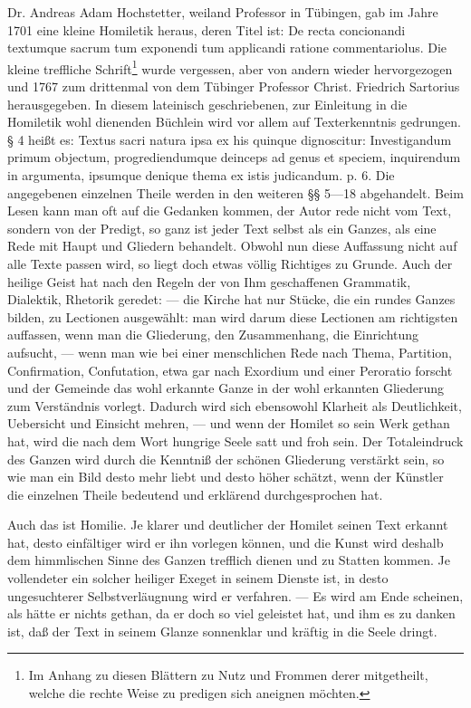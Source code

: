 Dr. Andreas Adam Hochstetter, weiland Professor in Tübingen, gab im Jahre 1701 eine kleine Homiletik heraus, deren Titel ist: De recta concionandi textumque sacrum tum exponendi tum applicandi ratione commentariolus. Die kleine treffliche Schrift\footnote{Im Anhang zu diesen Blättern zu Nutz und Frommen derer mitgetheilt, welche die rechte Weise zu predigen sich aneignen möchten.} wurde vergessen, aber von andern wieder hervorgezogen und 1767 zum drittenmal von dem Tübinger Professor Christ. Friedrich Sartorius herausgegeben. In diesem lateinisch geschriebenen, zur Einleitung in die Homiletik
wohl dienenden Büchlein wird vor allem auf Texterkenntnis gedrungen. § 4 heißt es: Textus sacri natura ipsa ex his quinque dignoscitur: Investigandum primum objectum, progrediendumque deinceps ad genus et speciem, inquirendum in argumenta, ipsumque denique thema ex istis judicandum. p. 6. Die angegebenen einzelnen Theile werden in den weiteren §§ 5—18 abgehandelt. Beim Lesen kann man oft auf die Gedanken kommen, der Autor rede nicht vom Text, sondern von der Predigt, so ganz ist jeder Text selbst als ein Ganzes, als eine Rede mit Haupt und Gliedern behandelt. Obwohl nun diese Auffassung nicht auf alle Texte passen wird, so liegt doch etwas völlig Richtiges zu Grunde. Auch der heilige Geist hat nach den Regeln der von Ihm geschaffenen Grammatik, Dialektik, Rhetorik geredet: — die Kirche hat nur Stücke, die ein rundes Ganzes bilden, zu Lectionen ausgewählt: man wird darum diese Lectionen am richtigsten auffassen, wenn man die Gliederung, den Zusammenhang, die Einrichtung aufsucht, — wenn man wie bei einer menschlichen Rede nach Thema, Partition, Confirmation, Confutation, etwa gar nach Exordium und einer Peroratio forscht und der Gemeinde das wohl erkannte Ganze in der wohl erkannten Gliederung zum Verständnis vorlegt. Dadurch wird sich ebensowohl Klarheit als Deutlichkeit, Uebersicht und Einsicht mehren, — und wenn der Homilet so sein Werk gethan hat, wird die nach dem Wort hungrige Seele satt und froh sein. Der Totaleindruck des Ganzen wird durch die Kenntniß der schönen Gliederung verstärkt sein, so wie man
ein Bild desto mehr liebt und desto höher schätzt, wenn der Künstler die einzelnen Theile bedeutend und erklärend durchgesprochen hat.

Auch das ist Homilie. Je klarer und deutlicher der Homilet seinen Text erkannt hat, desto einfältiger wird er ihn vorlegen können, und die Kunst wird deshalb dem himmlischen Sinne des Ganzen trefflich dienen und zu Statten kommen. Je vollendeter ein solcher heiliger Exeget in seinem Dienste ist, in desto ungesuchterer Selbstverläugnung wird er verfahren. — Es wird am Ende scheinen, als hätte er nichts gethan, da er doch so viel geleistet hat, und ihm es zu danken ist, daß der Text in seinem Glanze sonnenklar und kräftig in die Seele dringt.


